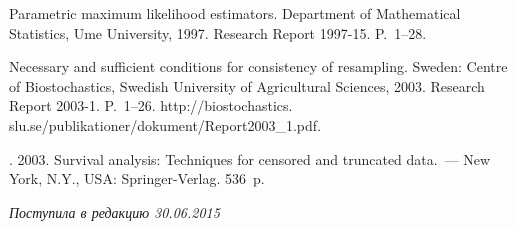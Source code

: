 \begin{multicols}{2}
{{\begin{thebibliography}{99}
 Parametric maximum likelihood estimators.
Department of Mathematical Statistics,
\mbox{Ume} University,
1997. Research Report 1997-15. P.~1--28.


Necessary and sufficient conditions for consistency of resampling.
Sweden: Centre of Biostochastics,  Swedish University of Agricultural
Sciences,  2003. Research Report 2003-1. P.~1--26.
{\sf http://biostochastics. slu.se/publikationer/dokument/Report2003\_1.pdf}.

.  
2003. {Survival analysis: Techniques for censored
 and truncated data}.~---  New York, N.Y., USA: Springer-Verlag. 536~p.


\end{thebibliography}
} }

\end{multicols}

 \label{end\stat}

 \vspace*{-6pt}

\hfill{\small\textit{Поступила в редакцию  30.06.2015}}
\renewcommand{\figurename}{\protect\bf Рис.}